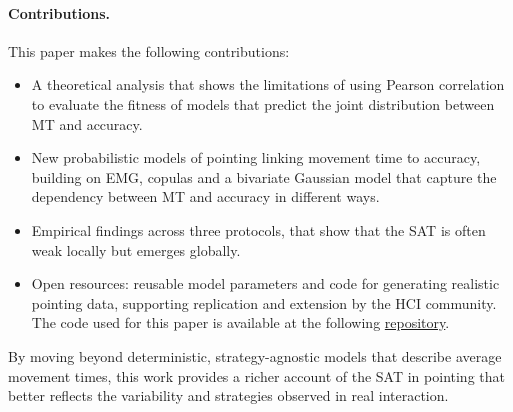 \documentclass[acmlarge, manuscript,review]{acmart}
\begin{document}
\paragraph{Contributions.} 
This paper makes the following contributions:
\begin{itemize}
	\item A theoretical analysis that shows the limitations of using Pearson correlation to evaluate the fitness of models that predict the joint distribution between MT and accuracy.
	\item New probabilistic models of pointing linking movement time to accuracy, building on EMG, copulas and a bivariate Gaussian model that capture the dependency between MT and accuracy in different ways. 
	\item Empirical findings across three protocols, that show that the SAT is often weak locally but emerges globally.
	\item Open resources: reusable model parameters and code for generating realistic pointing data, supporting replication and extension by the HCI community. The code used for this paper is available at the following \href{https://github.com/jgori-ouistiti/pointing_models}{\color{blue} repository}.
\end{itemize}

By moving beyond deterministic, strategy-agnostic models that describe average movement times, this work provides a richer account of the SAT in pointing that better reflects the variability and strategies observed in real interaction.









	
\end{document}
